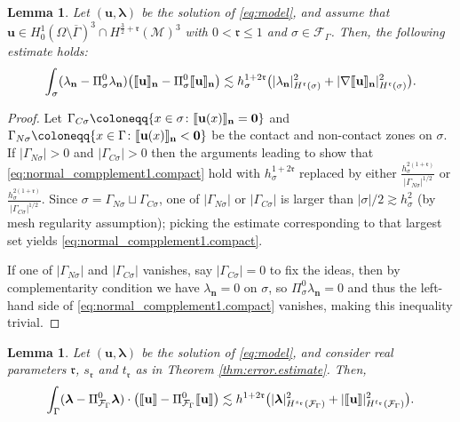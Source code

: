 \documentclass[a4paper,11pt]{article}
\newtheorem{lemma}[theorem]{Lemma}
\theoremstyle{definition}
\theoremstyle{remark}
\newcommand{\bo}[1]{\mathbf{#1}}
\def\cF{\mathcal{F}}
\def\cM{\mathcal{M}}
\def\fr{\mathfrak{r}}
\def\blambda{\boldsymbol{\lambda}}
\def\sjump#1{[\hskip -1.5pt[#1]\hskip -1.5pt]}
\def\O{\Omega}
\begin{document}
\begin{lemma}\label{lemma:normal_complement}
Let $(\bo{u},\blambda)$ be the solution of \eqref{eq:model}, and assume that $\bo{u}\in H^1_0(\O\setminus\overline{\Gamma})^3\cap H^{\frac{3}{2}+\fr}(\cM)^3$ with $0<\fr\leq 1$ and $\sigma\in\cF_\Gamma$.  
Then, the following estimate holds:
\begin{equation}\label{eq:normal_compplement1.compact}
\int_{\sigma}(\lambda_{\bo{n}}-\Pi^0_{\sigma}\lambda_{\bo{n}})\big( \sjump{\bo{u}}_{\bo{n}}-\Pi^0_{\sigma}\sjump{\bo{u}}_{\bo{n}}\big)\lesssim h_\sigma^{1+2\fr}\big(\lvert \lambda_{\bo{n}}\rvert^2_{H^{\fr}(\sigma)}+\lvert\nabla \sjump{\bo{u}}_{\bo{n}}\rvert^2_{H^{\fr}(\sigma)}\big).
\end{equation}
\end{lemma}

\begin{proof}
Let $\Gamma_{C\sigma}\coloneqq\{x\in\sigma\colon\sjump{\bo{u}(x)}_{\bo{n}}=\bo{0}\}$ and $\Gamma_{N\sigma}\coloneqq\{x\in\Gamma\colon\sjump{\bo{u}(x)}_{\bo{n}}<\bo{0}\}$ be the contact and non-contact zones on $\sigma$.
If $|\Gamma_{N\sigma}|>0$ and $|\Gamma_{C\sigma}|>0$ then the arguments leading to \cite[Eq.~(33) and (34)]{MR3357636} show that \eqref{eq:normal_compplement1.compact} hold with $h_\sigma^{1+2\fr}$ replaced by either $\frac{h_\sigma^{2(1+\fr)}}{|\Gamma_{N\sigma}|^{1/2}}$ or $\frac{h_\sigma^{2(1+\fr)}}{|\Gamma_{C\sigma}|^{1/2}}$.
Since $\sigma=\Gamma_{N\sigma}\sqcup \Gamma_{C\sigma}$, one of $|\Gamma_{N\sigma}|$ or $|\Gamma_{C\sigma}|$ is larger than $|\sigma|/2\gtrsim h_\sigma^2$ (by mesh regularity assumption); picking the estimate corresponding to that largest set yields \eqref{eq:normal_compplement1.compact}.

If one of $|\Gamma_{N\sigma}|$ and $|\Gamma_{C\sigma}|$ vanishes, say $|\Gamma_{C\sigma}|=0$ to fix the ideas, then by complementarity condition we have $\lambda_{\bo{n}}=0$ on $\sigma$, so $\Pi^0_{\sigma}\lambda_{\bo{n}}=0$ and thus the left-hand side of \eqref{eq:normal_compplement1.compact} vanishes, making this inequality trivial.
\end{proof}

\begin{lemma}\label{l5.9}
Let $(\bo{u},\blambda)$ be the solution of \eqref{eq:model}, and consider real parameters $\fr$, $s_{\fr}$ and $t_\fr$ as in Theorem \ref{thm:error.estimate}. Then, 
\begin{equation}\label{eq:bound.u.lambda}
\int_{\Gamma}(\blambda-\Pi^0_{{\cF}_\Gamma}\blambda)\cdot\big( \sjump{\bo{u}}-\Pi^0_{\cF_\Gamma}\sjump{\bo{u}}\big)\lesssim  h^{1+2\fr}\big(\lvert \blambda\rvert^2_{H^{s_\fr}(\cF_\Gamma)}+\lvert \sjump{\bo{u}}\rvert^2_{H^{t_\fr}(\cF_\Gamma)}\big).
\end{equation}
\end{lemma}
\end{document}
